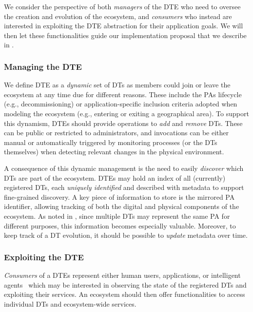 We consider the perspective of both \emph{managers} of the \ac{DTE} who need to oversee the creation and evolution of the ecosystem, and \emph{consumers} who instead are interested in exploiting the \ac{DTE} abstraction for their application goals.
%
We will then let these functionalities guide our implementation proposal that we describe in .

\subsubsection{Managing the \ac{DTE}}\label{sssec:operational-managing}

We define \ac{DTE} as a \emph{dynamic} set of \acp{DT} as members could join or leave the ecosystem at any time due for different reasons.
These include the \acp{PA} lifecycle (e.g., decommissioning) or application-specific inclusion criteria adopted when modeling the ecosystem (e.g., entering or exiting a geographical area).
%
To support this dynamism, \acp{DTE} should provide operations to \emph{add} and \emph{remove} \acp{DT}.
These can be public or restricted to administrators, and invocations can be either manual or automatically triggered by monitoring processes (or the \acp{DT} themselves) when detecting relevant changes in the physical environment.

A consequence of this dynamic management is the need to easily \emph{discover} which \acp{DT} are part of the ecosystem.
\acp{DTE} may hold an index of all (currently) registered \acp{DT}, each \emph{uniquely identified} and described with metadata to support fine-grained discovery.
%
A key piece of information to store is the mirrored \ac{PA} identifier, allowing tracking of both the digital and physical components of the ecosystem.
As noted in , since multiple \acp{DT} may represent the same \ac{PA} for different purposes, this information becomes especially valuable.
Moreover, to keep track of a \ac{DT} evolution, it should be possible to \emph{update} metadata over time.

\subsubsection{Exploiting the \ac{DTE}}\label{sssec:operational-exploiting}

\emph{Consumers} of a \acp{DTE} represent either human users, applications, or intelligent agents~\cite{burattini2025iot} which may be interested in observing the state of the registered \acp{DT} and exploiting their services.
%
An ecosystem should then offer functionalities to access individual \acp{DT} and ecosystem-wide services. 

